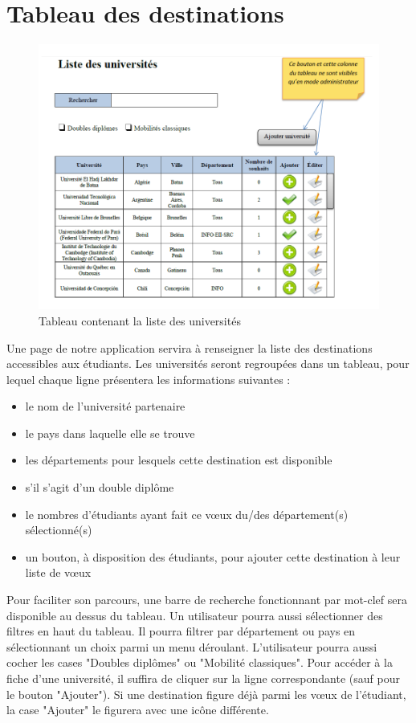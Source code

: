 \section{Tableau des destinations}
\label{sec::list_univ}

\begin{figure}[H]
	\includegraphics[scale=0.7]{Universites/listeUnivs.png}
	\caption{Tableau contenant la liste des universités}
\end{figure}



Une page de notre application servira à renseigner la liste des destinations accessibles aux étudiants.
Les universités seront regroupées dans un tableau, pour lequel chaque ligne présentera les informations suivantes :
 \begin{itemize}
 	\item le nom de l'université partenaire
 	\item le pays dans laquelle elle se trouve
 	\item les départements pour lesquels cette destination est disponible
 	\item s'il s'agit d'un double diplôme
 	\item le nombres d'étudiants ayant fait ce vœux du/des département(s) sélectionné(s)
 	\item un bouton, à disposition des étudiants, pour ajouter cette destination à leur liste de vœux
 \end{itemize}
 
  Pour faciliter son parcours, une barre de recherche fonctionnant par mot-clef sera disponible au dessus du tableau. Un utilisateur pourra aussi sélectionner des filtres en haut du tableau. Il pourra filtrer par département ou pays en sélectionnant un choix parmi un menu déroulant. L'utilisateur pourra aussi cocher les cases "Doubles diplômes" ou "Mobilité classiques". Pour accéder à la fiche d'une université, il suffira de cliquer sur la ligne correspondante (sauf pour le bouton "Ajouter"). Si une destination figure déjà parmi les vœux de l'étudiant, la case "Ajouter" le figurera avec une icône différente.
  
